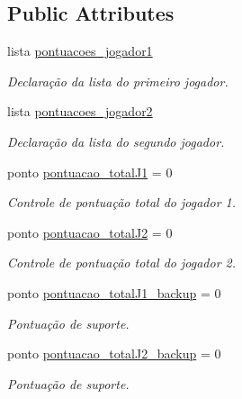 \subsection*{Public Attributes}
\begin{DoxyCompactItemize}
\item 
\mbox{\label{structpt_1_1Pontos_a4f3aa31979d2c4c444353cad4ba40422}} 
lista \hyperlink{structpt_1_1Pontos_a4f3aa31979d2c4c444353cad4ba40422}{pontuacoes\+\_\+jogador1}
\begin{DoxyCompactList}\small\item\em Declaração da lista do primeiro jogador. \end{DoxyCompactList}\item 
\mbox{\label{structpt_1_1Pontos_a1d54f45263dc0e4d650043bf9b430586}} 
lista \hyperlink{structpt_1_1Pontos_a1d54f45263dc0e4d650043bf9b430586}{pontuacoes\+\_\+jogador2}
\begin{DoxyCompactList}\small\item\em Declaração da lista do segundo jogador. \end{DoxyCompactList}\item 
\mbox{\label{structpt_1_1Pontos_a2c8387f0d35bf86a8169f155934a5858}} 
ponto \hyperlink{structpt_1_1Pontos_a2c8387f0d35bf86a8169f155934a5858}{pontuacao\+\_\+total\+J1} = 0
\begin{DoxyCompactList}\small\item\em Controle de pontuação total do jogador 1. \end{DoxyCompactList}\item 
\mbox{\label{structpt_1_1Pontos_ad03e94a71ee84b6195667481b89ddf51}} 
ponto \hyperlink{structpt_1_1Pontos_ad03e94a71ee84b6195667481b89ddf51}{pontuacao\+\_\+total\+J2} = 0
\begin{DoxyCompactList}\small\item\em Controle de pontuação total do jogador 2. \end{DoxyCompactList}\item 
\mbox{\label{structpt_1_1Pontos_a18fe3604b5214d46ee7f423d2c94f9be}} 
ponto \hyperlink{structpt_1_1Pontos_a18fe3604b5214d46ee7f423d2c94f9be}{pontuacao\+\_\+total\+J1\+\_\+backup} = 0
\begin{DoxyCompactList}\small\item\em Pontuação de suporte. \end{DoxyCompactList}\item 
\mbox{\label{structpt_1_1Pontos_adfabd173b2bde97773d36c2f81f88ff0}} 
ponto \hyperlink{structpt_1_1Pontos_adfabd173b2bde97773d36c2f81f88ff0}{pontuacao\+\_\+total\+J2\+\_\+backup} = 0
\begin{DoxyCompactList}\small\item\em Pontuação de suporte. \end{DoxyCompactList}\end{DoxyCompactItemize}


